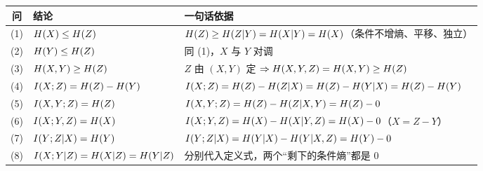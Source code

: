 \documentclass[11pt,a4paper]{ctexart}
\begin{document}
\begin{center}
\renewcommand{\arraystretch}{1.32}
\small
\begin{tabular}{@{}c >{\raggedright\arraybackslash}p{4.6cm} >{\raggedright\arraybackslash}p{8.6cm}@{}}
\toprule
问 & 结论 & 一句话依据 \\
\midrule
(1) & $\Hx{X}\le\Hx{Z}$ & $\Hx{Z}\ge\Hx{Z|Y}=\Hx{X|Y}=\Hx{X}$（条件不增熵、平移、独立）\\
(2) & $\Hx{Y}\le\Hx{Z}$ & 同 (1)，$X$ 与 $Y$ 对调\\
(3) & $\Hx{X,Y}\ge\Hx{Z}$ & $Z$ 由 $(X,Y)$ 定 $\Rightarrow\Hx{X,Y,Z}=\Hx{X,Y}\ge\Hx{Z}$\\
(4) & $\I{X;Z}=\Hx{Z}-\Hx{Y}$ & $\I{X;Z}=\Hx{Z}-\Hx{Z|X}=\Hx{Z}-\Hx{Y|X}=\Hx{Z}-\Hx{Y}$\\
(5) & $\I{X,Y;Z}=\Hx{Z}$ & $\I{X,Y;Z}=\Hx{Z}-\Hx{Z|X,Y}=\Hx{Z}-0$\\
(6) & $\I{X;Y,Z}=\Hx{X}$ & $\I{X;Y,Z}=\Hx{X}-\Hx{X|Y,Z}=\Hx{X}-0$（$X=Z-Y$）\\
(7) & $\I{Y;Z|X}=\Hx{Y}$ & $\I{Y;Z|X}=\Hx{Y|X}-\Hx{Y|X,Z}=\Hx{Y}-0$\\
(8) & $\I{X;Y|Z}=\Hx{X|Z}=\Hx{Y|Z}$ & 分别代入定义式，两个“剩下的条件熵”都是 $0$\\
\bottomrule
\end{tabular}
\end{center}
\end{document}
